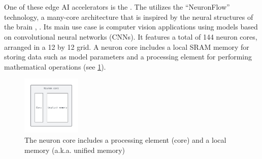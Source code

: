 \section{\graicore{}}

One of these edge AI accelerators is the \graicore{}.
The \graicore{} utilizes the ``NeuronFlow'' technology, a many-core architecture that is inspired by the neural structures of the brain \cite{moreiraNeuronFlowNeuromorphicProcessor2020}, \cite{moreira_neuronflow_2020}.
Its main use case is computer vision applications using models based on convolutional neural networks (CNNs).
It features a total of 144 neuron cores, arranged in a 12 by 12 grid.
A neuron core includes a local SRAM memory for storing data such as model parameters and a processing element for performing mathematical operations (see \cref{fig:neuron_core}).

\begin{figure}[htbp]
    \centering
    \includegraphics[width=0.25\textwidth]{assets/neuron_core.pdf}
    \caption{The neuron core includes a processing element (core) and a local memory (a.k.a. unified memory)}
    \label{fig:neuron_core}
\end{figure}

